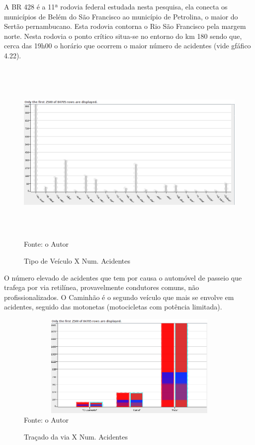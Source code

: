 A BR 428 é a 11ª rodovia federal estudada nesta pesquisa, ela conecta os municípios de Belém do São Francisco ao município de Petrolina, o maior do Sertão pernambucano. Esta rodovia contorna o Rio São Francisco pela margem norte. Nesta rodovia o ponto crítico situa-se no entorno do km 180 sendo que, cerca das 19h00 o horário que ocorrem o maior número de acidentes (vide gfáfico 4.22).  
\pagebreak

\begin{figure}[!ht]
\begin{center}
\caption{Tipo de Veículo X Num. Acidentes}
\includegraphics[width=150mm, height=90mm]{Figuras/Preprocess/TipoVeiculoXNumAciden.png}\\
\tiny Fonte: o Autor
\end{center}
\end{figure}

O número elevado de acidentes que tem por causa o automóvel de passeio que trafega por via retilínea, provavelmente condutores comuns, não profissionalizados.
O Caminhão é o segundo veículo que mais se envolve em acidentes, seguido das motonetas (motocicletas com potência limitada). 


\begin{figure}[ht]
\begin{center}
\caption{Traçado da via X Num. Acidentes}
\includegraphics[width=150mm, height=50mm]{Figuras/Preprocess/TracadoViaNumAcident.png}\\
\tiny Fonte: o Autor
\end{center}
\end{figure}


